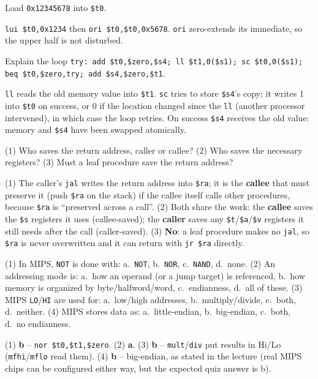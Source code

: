 \documentclass[11pt]{article}
\begin{document}
\begin{exercise}
Load \texttt{0x12345678} into \texttt{\$t0}.
\end{exercise}
\begin{solution}
\texttt{lui \$t0,0x1234} then \texttt{ori \$t0,\$t0,0x5678}. \texttt{ori}
zero-extends its immediate, so the upper half is not disturbed.
\end{solution}

\begin{exercise}
Explain the loop
\texttt{try: add \$t0,\$zero,\$s4; ll \$t1,0(\$s1); sc \$t0,0(\$s1);
beq \$t0,\$zero,try; add \$s4,\$zero,\$t1}.
\end{exercise}
\begin{solution}
\texttt{ll} reads the old memory value into \texttt{\$t1}. \texttt{sc}
tries to store \texttt{\$s4}'s copy; it writes 1 into \texttt{\$t0} on
success, or 0 if the location changed since the \texttt{ll} (another
processor intervened), in which case the loop retries. On success
\texttt{\$s4} receives the old value: memory and \texttt{\$s4} have been
swapped atomically.
\end{solution}

\begin{exercise}
(1) Who saves the return address, caller or callee? (2) Who saves the
necessary registers? (3) Must a leaf procedure save the return address?
\end{exercise}
\begin{solution}
(1) The caller's \texttt{jal} writes the return address into \texttt{\$ra};
it is the \textbf{callee} that must preserve it (push \texttt{\$ra} on the
stack) if the callee itself calls other procedures, because \texttt{\$ra} is
``preserved across a call''. (2) Both share the work: the \textbf{callee}
saves the \texttt{\$s} registers it uses (callee-saved); the \textbf{caller}
saves any \texttt{\$t}/\texttt{\$a}/\texttt{\$v} registers it still needs
after the call (caller-saved). (3) \textbf{No}: a leaf procedure makes no
\texttt{jal}, so \texttt{\$ra} is never overwritten and it can return with
\texttt{jr \$ra} directly.
\end{solution}

\begin{exercise}
(1) In MIPS, \texttt{NOT} is done with: a.\ \texttt{NOT}, b.\ \texttt{NOR},
c.\ \texttt{NAND}, d.\ none.
(2) An addressing mode is: a.\ how an operand (or a jump target) is
referenced, b.\ how memory is organized by byte/halfword/word, c.\
endianness, d.\ all of these.
(3) MIPS \texttt{LO}/\texttt{HI} are used for: a.\ low/high addresses, b.\
multiply/divide, c.\ both, d.\ neither.
(4) MIPS stores data as: a.\ little-endian, b.\ big-endian, c.\ both, d.\
no endianness.
\end{exercise}
\begin{solution}
(1) \textbf{b} -- \texttt{nor \$t0,\$t1,\$zero}.
(2) \textbf{a}.
(3) \textbf{b} -- \texttt{mult}/\texttt{div} put results in Hi/Lo
(\texttt{mfhi}/\texttt{mflo} read them).
(4) \textbf{b} -- big-endian, as stated in the lecture (real MIPS chips can
be configured either way, but the expected quiz answer is b).
\end{solution}
\end{document}
